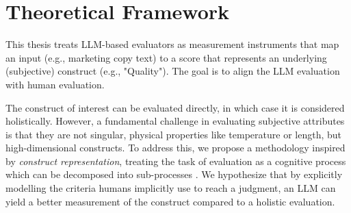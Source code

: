 
\section{Theoretical Framework}\label{sec:theoretical_framework}


This thesis treats LLM-based evaluators as measurement instruments that map an input (e.g., marketing copy text) to a score that represents an underlying (subjective) construct (e.g., "Quality"). The goal is to align the LLM evaluation with human evaluation. 

The construct of interest can be evaluated directly, in which case it is considered holistically. However, a fundamental challenge in evaluating subjective attributes is that they are not singular, physical properties like temperature or length, but high-dimensional constructs. To address this, we propose a methodology inspired by \textit{construct representation}, treating the task of evaluation as a cognitive process which can be decomposed into sub-processes \citep{whitely1983construct, messick_validity_1994}. We hypothesize that by explicitly modelling the criteria humans implicitly use to reach a judgment, an LLM can yield a better measurement of the construct compared to a holistic evaluation.



